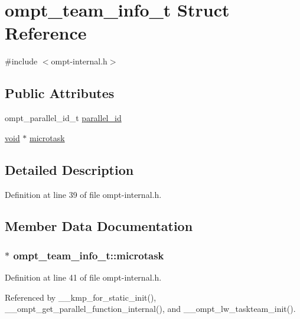 \hypertarget{structompt__team__info__t}{\section{ompt\-\_\-team\-\_\-info\-\_\-t Struct Reference}
\label{structompt__team__info__t}
}


{\ttfamily \#include $<$ompt-\/internal.\-h$>$}

\subsection*{Public Attributes}
\begin{DoxyCompactItemize}
\item 
ompt\-\_\-parallel\-\_\-id\-\_\-t \hyperlink{structompt__team__info__t_aea8969d8ca37577c35b466c675a7a241}{parallel\-\_\-id}
\item 
\hyperlink{ittnotify__static_8h_af941d56e55e3c5465135b60c4d6343ed}{void} $\ast$ \hyperlink{structompt__team__info__t_a8fa76f60a770055c3f0bed45a7120cd6}{microtask}
\end{DoxyCompactItemize}


\subsection{Detailed Description}


Definition at line 39 of file ompt-\/internal.\-h.



\subsection{Member Data Documentation}
\hypertarget{structompt__team__info__t_a8fa76f60a770055c3f0bed45a7120cd6}{
\subsubsection[{microtask}]{$\ast$ ompt\-\_\-team\-\_\-info\-\_\-t\-::microtask}}\label{structompt__team__info__t_a8fa76f60a770055c3f0bed45a7120cd6}


Definition at line 41 of file ompt-\/internal.\-h.



Referenced by \-\_\-\-\_\-kmp\-\_\-for\-\_\-static\-\_\-init(), \-\_\-\-\_\-ompt\-\_\-get\-\_\-parallel\-\_\-function\-\_\-internal(), and \-\_\-\-\_\-ompt\-\_\-lw\-\_\-taskteam\-\_\-init().

